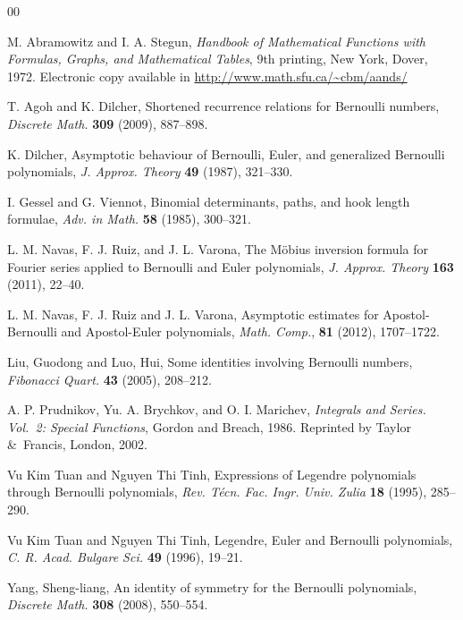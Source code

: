 \documentclass[a4paper,reqno]{amsart}
\theoremstyle{plain}
\numberwithin{equation}{section}
\theoremstyle{remark}
\begin{document}
\begin{thebibliography}{00}

 M. Abramowitz and I. A. Stegun,
\textit{Handbook of Mathematical Functions with Formulas, Graphs, and Mathematical Tables},
9th printing, New York, Dover, 1972.
Electronic copy available in \url{http://www.math.sfu.ca/~cbm/aands/}

 T. Agoh and K. Dilcher,
\textrm{Shortened recurrence relations for Bernoulli numbers},
\textit{Discrete Math.} \textbf{309} (2009), 887--898.

 K. Dilcher,
\textrm{Asymptotic behaviour of Bernoulli, Euler, and generalized Bernoulli polynomials},
\textit{J. Approx. Theory}
\textbf{49} (1987), 321--330.

 I. Gessel and G. Viennot,
\textrm{Binomial determinants, paths, and hook length formulae},
\textit{Adv. in Math.} 
\textbf{58} (1985), 300--321.

 L. M. Navas, F. J. Ruiz, and J. L. Varona, 
\textrm{The M\"{o}bius inversion formula for Fourier series applied to Bernoulli and Euler polynomials},
\textit{J. Approx. Theory}
\textbf{163} (2011), 22--40. 

L. M. Navas, F. J. Ruiz and J. L. Varona,
Asymptotic estimates for Apostol-Bernoulli and Apostol-Euler polynomials,
\textit{Math. Comp.},
\textbf{81} (2012), 1707--1722. 

 Liu, Guodong and Luo, Hui,
\textrm{Some identities involving Bernoulli numbers},
\textit{Fibonacci Quart.}
\textbf{43} (2005), 208--212.

 A. P. Prudnikov, Yu. A. Brychkov, and O. I. Marichev,
\textit{Integrals and Series. Vol.~2: Special Functions},
Gordon and Breach, 1986.
Reprinted by Taylor \&\ Francis, London, 2002.

 Vu Kim Tuan and Nguyen Thi Tinh,
\textrm{Expressions of Legendre polynomials through Bernoulli polynomials},
\textit{Rev. T\'ecn. Fac. Ingr. Univ. Zulia} %
\textbf{18} (1995), 285--290.

 Vu Kim Tuan and Nguyen Thi Tinh,
\textrm{Legendre, Euler and Bernoulli polynomials},
\textit{C. R. Acad. Bulgare Sci.}
\textbf{49} (1996), 19--21.

 Yang, Sheng-liang, 
\textrm{An identity of symmetry for the Bernoulli polynomials},
\textit{Discrete Math.} \textbf{308} (2008), 550--554.

\end{thebibliography}
\end{document}
